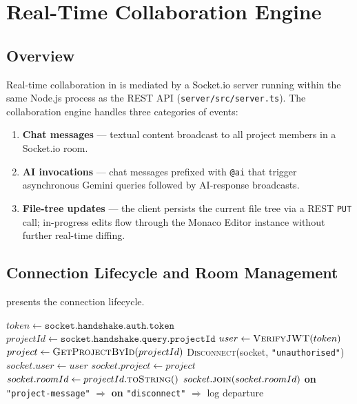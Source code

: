 \section{Real-Time Collaboration Engine}
\label{sec:realtime}

\subsection{Overview}

Real-time collaboration in \echoray{} is mediated by a Socket.io server
running within the same Node.js process as the REST API
(\texttt{server/src/server.ts}).  The collaboration engine handles three
categories of events:

\begin{enumerate}[leftmargin=*, label=(\roman*)]
  \item \textbf{Chat messages} --- textual content broadcast to all project
    members in a Socket.io room.
  \item \textbf{AI invocations} --- chat messages prefixed with \texttt{@ai}
    that trigger asynchronous Gemini queries followed by AI-response
    broadcasts.
  \item \textbf{File-tree updates} --- the client persists the current file
    tree via a REST \texttt{PUT} call; in-progress edits flow through the
    Monaco Editor instance without further real-time diffing.
\end{enumerate}

\subsection{Connection Lifecycle and Room Management}

 presents the connection lifecycle.

\begin{algorithm}[H]
\caption{Socket.io Connection Lifecycle (\texttt{socket.ts})}
\label{alg:socket_lifecycle}
\begin{algorithmic}[1]
\State $token \gets \texttt{socket.handshake.auth.token}$
\State $projectId \gets \texttt{socket.handshake.query.projectId}$
\State $user \gets \textsc{VerifyJWT}(token)$  
\State $project \gets \textsc{GetProjectById}(projectId)$
  \State \textsc{Disconnect}(socket, \texttt{"unauthorised"})
\EndIf
\State $socket.user \gets user$
\State $socket.project \gets project$
\State $socket.roomId \gets projectId.\textsc{toString}()$
\State $socket.\textsc{join}(socket.roomId)$  
\State \textbf{on} \texttt{"project-message"} $\Rightarrow$ 
\State \textbf{on} \texttt{"disconnect"} $\Rightarrow$ log departure
\end{algorithmic}
\end{algorithm}


